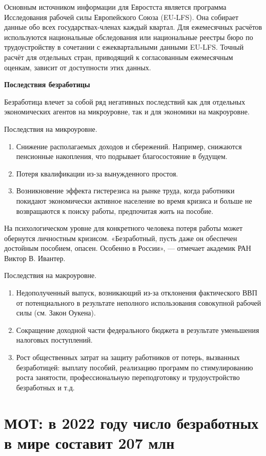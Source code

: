 Основным источником информации для Евростста является программа Исследования рабочей силы Европейского Союза (EU-LFS). Она собирает данные обо всех государствах-членах каждый квартал. Для ежемесячных расчётов используются национальные обследования или национальные реестры бюро по трудоустройству в сочетании с ежеквартальными данными EU-LFS. Точный расчёт для отдельных стран, приводящий к согласованным ежемесячным оценкам, зависит от доступности этих данных.

\textbf{Последствия безработицы}

Безработица влечет за собой ряд негативных последствий как для отдельных экономических агентов на микроуровне, так и для экономики на макроуровне.

Последствия на микроуровне.
\begin{enumerate}
    \item Снижение располагаемых доходов и сбережений. Например, снижаются пенсионные накопления, что подрывает благосостояние в будущем.
    \item Потеря квалификации из-за вынужденного простоя.
    \item Возникновение эффекта гистерезиса на рынке труда, когда работники покидают экономически активное население во время кризиса и больше не возвращаются к поиску работы, предпочитая жить на пособие.
\end{enumerate}
На психологическом уровне для конкретного человека потеря работы может обернутся личностным кризисом. «Безработный, пусть даже он обеспечен достойным пособием, опасен. Особенно в России», — отмечает академик РАН Виктор В. Ивантер.

Последствия на макроуровне.
\begin{enumerate}
    \item Недополученный выпуск, возникающий из-за отклонения фактического ВВП от потенциального в результате неполного использования совокупной рабочей силы (см. Закон Оукена).
    \item Сокращение доходной части федерального бюджета в результате уменьшения налоговых поступлений.
    \item Рост общественных затрат на защиту работников от потерь, вызванных безработицей: выплату пособий, реализацию программ по стимулированию роста занятости, профессиональную переподготовку и трудоустройство безработных и т.д.
\end{enumerate}

\newpage
\section{МОТ: в 2022 году число безработных в мире составит 207 млн}

